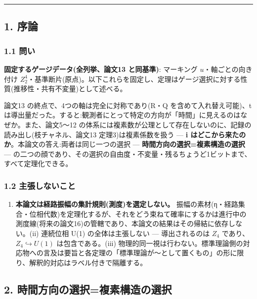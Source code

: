 \documentclass[
]{ltjsarticle}
\providecommand{\tightlist}{%
  \setlength{\itemsep}{0pt}\setlength{\parskip}{0pt}}
\begin{document}
\begin{center}\rule{0.5\linewidth}{0.5pt}\end{center}

\subsection{1. 序論}\label{ux5e8fux8ad6}

\subsubsection{1.1 問い}\label{ux554fux3044}

\textbf{固定するゲージデータ(全列挙、論文13 と同基準)}: マーキング
\(u\)・軸ごとの向き付け
\(Z_2^{4}\)・基準断片(原点)。以下これらを固定し、定理はゲージ選択に対する性質(推移性・共有不変量)として述べる。

論文13 の終点で、4つの軸は完全に対称であり(R・Q を含めて入れ替え可能)、t
は導出量だった。すると:観測者にとって特定の方向が「時間」に見えるのはなぜか。また、論文5〜12
の体系には複素数が公理として存在しないのに、記録の読み出し(枝チャネル、論文13
定理3)は複素係数を扱う --- \textbf{i
はどこから来たのか}。本論文の答え:両者は同じ一つの選択 ---
\textbf{時間方向の選択=複素構造の選択} ---
の二つの顔であり、その選択の自由度・不変量・残るちょうど1ビットまで、すべて定理化できる。

\subsubsection{1.2
主張しないこと}\label{ux4e3bux5f35ux3057ux306aux3044ux3053ux3068}

\begin{enumerate}
\def\labelenumi{(\roman{enumi})}
\tightlist
\item
  \textbf{本論文は経路振幅の集計規則(測度)を選定しない。}
  振幅の素材(η・経路集合・位相代数)を定理化するが、それをどう束ねて確率にするかは進行中の測度線(将来の論文16)の管轄であり、本論文の結果はその帰結に依存しない。(ii)
  連続位相 U(1) の全体は主張しない --- 導出されるのは \(Z_4\)
  であり、\(Z_4\hookrightarrow U(1)\) は包含である。(iii)
  物理的同一視は行わない。標準理論側の対応物への言及は要旨と各定理の「標準理論が〜として置くもの」の形に限り、解釈的対応はラベル付きで隔離する。
\end{enumerate}

\subsection{2.
時間方向の選択=複素構造の選択}\label{ux6642ux9593ux65b9ux5411ux306eux9078ux629eux8907ux7d20ux69cbux9020ux306eux9078ux629e}
\end{document}

